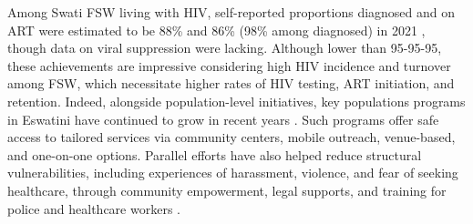 \par
Among Swati FSW living with HIV, self-reported proportions diagnosed and on ART
were estimated to be 88\% and 86\% (98\% among diagnosed) in 2021 \cite{EswIBBS2022},
though data on viral suppression were lacking.
Although lower than 95-95-95, these achievements are impressive
considering high HIV incidence and turnover among FSW,
which necessitate higher rates of HIV testing, ART initiation, and retention.
Indeed, alongside population-level initiatives,
key populations programs in Eswatini have continued to grow in recent years \cite{EswIBBS2022}.
Such programs offer safe access to tailored services via
community centers, mobile outreach, venue-based, and one-on-one options.
Parallel efforts have also helped reduce structural vulnerabilities,
including experiences of harassment, violence, and fear of seeking healthcare,
through community empowerment, legal supports, and
training for police and healthcare workers \cite{EswIBBS2022}.
